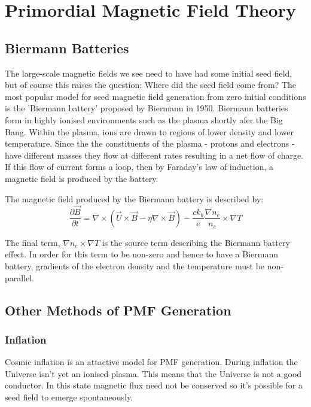 \section{Primordial Magnetic Field Theory}

\subsection{Biermann Batteries}

The large-scale magnetic fields we see need to have had some initial seed field, but of course this raises the question: Where did the seed field come from? The most popular model for seed magnetic field generation from zero initial conditions is the 'Biermann battery' proposed by Biermann in 1950. Biermann batteries form in highly ionised environments such as the plasma shortly afer the Big Bang. Within the plasma, ions are drawn to regions of lower density and lower temperature. Since the the constituents of the plasma - protons and electrons - have different masses they flow at different rates resulting in a net flow of charge. If this flow of current forms a loop, then by Faraday's law of induction, a magnetic field is produced by the battery.

The magnetic field produced by the Biermann battery is described by:
\begin{equation}
\label{eqn:biermann}
\frac{\partial \vec{B}}{\partial t} = \nabla\times(\vec{U}\times\vec{B}-\eta\nabla \times\vec{B}) - \frac{c k_{b}}{e}\frac{\nabla n_e}{n_e} \times \nabla T
\end{equation}

The final term, $\nabla n_e \times \nabla T$ is the source term describing the Biermann battery effect. In order for this term to be non-zero and hence to have a Biermann battery, gradients of the electron density and the temperature must be non-parallel.

\subsection{Other Methods of PMF Generation}

\subsubsection{Inflation}
Cosmic inflation is an attactive model for PMF generation. During inflation the Universe isn't yet an ionised plasma. This means that the Universe is not a good conductor. In this state magnetic flux need not be conserved so it's possible for a seed field to emerge spontaneously.


